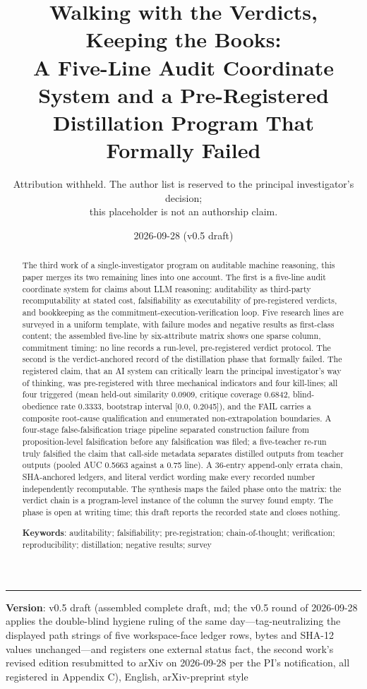 \documentclass[11pt]{article}
\title{\bfseries Walking with the Verdicts, Keeping the Books:\\ A Five-Line Audit Coordinate System and a Pre-Registered\\ Distillation Program That Formally Failed}
\author{Attribution withheld. The author list is reserved to the principal investigator's decision;\\ this placeholder is not an authorship claim.}
\date{2026-09-28 (v0.5 draft)}
\begin{document}
\maketitle
\thispagestyle{empty}

\begin{abstract}
The third work of a single-investigator program on auditable machine reasoning, this paper merges its two remaining lines into one account. The first is a five-line audit coordinate system for claims about LLM reasoning: auditability as third-party recomputability at stated cost, falsifiability as executability of pre-registered verdicts, and bookkeeping as the commitment-execution-verification loop. Five research lines are surveyed in a uniform template, with failure modes and negative results as first-class content; the assembled five-line by six-attribute matrix shows one sparse column, commitment timing: no line records a run-level, pre-registered verdict protocol. The second is the verdict-anchored record of the distillation phase that formally failed. The registered claim, that an AI system can critically learn the principal investigator's way of thinking, was pre-registered with three mechanical indicators and four kill-lines; all four triggered (mean held-out similarity 0.0909, critique coverage 0.6842, blind-obedience rate 0.3333, bootstrap interval [0.0, 0.2045]), and the FAIL carries a composite root-cause qualification and enumerated non-extrapolation boundaries. A four-stage false-falsification triage pipeline separated construction failure from proposition-level falsification before any falsification was filed; a five-teacher re-run truly falsified the claim that call-side metadata separates distilled outputs from teacher outputs (pooled AUC 0.5663 against a 0.75 line). A 36-entry append-only errata chain, SHA-anchored ledgers, and literal verdict wording make every recorded number independently recomputable. The synthesis maps the failed phase onto the matrix: the verdict chain is a program-level instance of the column the survey found empty. The phase is open at writing time; this draft reports the recorded state and closes nothing.

\medskip\noindent\textbf{Keywords}: auditability; falsifiability; pre-registration; chain-of-thought; verification; reproducibility; distillation; negative results; survey
\end{abstract}
\vspace{0.5em}\hrule\vspace{0.8em}
\noindent \textbf{Version}: v0.5 draft (assembled complete draft, md; the v0.5 round of 2026-09-28 applies the double-blind hygiene ruling of the same day—tag-neutralizing the displayed path strings of five workspace-face ledger rows, bytes and SHA-12 values unchanged—and registers one external status fact, the second work's revised edition resubmitted to arXiv on 2026-09-28 per the PI's notification, all registered in Appendix C), English, arXiv-preprint style\par\smallskip
\end{document}

